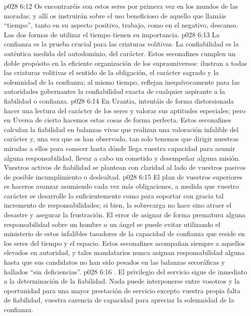 \vs p028 6:12 Os encontraréis con estos seres por primera vez en los mundos de las moradas; y allí os instruirán sobre el uso beneficioso de aquello que llamáis “tiempo”, tanto en su aspecto positivo, trabajo, como en el negativo, descanso. Las dos formas de utilizar el tiempo tienen su importancia.
\vs p028 6:13  La confianza es la prueba crucial para las criaturas volitivas. La confiabilidad es la auténtica medida del autodominio, del carácter. Estos seconafines cumplen un doble propósito en la eficiente organización de los suprauniversos: ilustran a todas las criaturas volitivas el sentido de la obligación, el carácter sagrado y la solemnidad de la confianza; al mismo tiempo, reflejan inequívocamente para las autoridades gobernantes la confiabilidad exacta de cualquier aspirante a la fiabilidad o confianza.
\vs p028 6:14 En Urantia, intentáis de forma distorsionada hacer una lectura del carácter de los seres y valorar sus aptitudes especiales; pero en Uversa de cierto hacemos estas cosas de forma perfecta. Estos seconafines calculan la fiabilidad en balanzas vivas que realizan una valoración infalible del carácter y, una vez que os han observado, tan solo tenemos que dirigir nuestras miradas a ellos para conocer hasta dónde llega vuestra capacidad para asumir alguna responsabilidad, llevar a cabo un cometido y desempeñar alguna misión. Vuestros activos de fiabilidad se plantean con claridad al lado de vuestros pasivos de posible incumplimiento o deslealtad.
\vs p028 6:15 \pc El plan de vuestros superiores es haceros avanzar asumiendo cada vez más obligaciones, a medida que vuestro carácter se desarrolle lo suficientemente como para soportar con gracia tal incremento de responsabilidades; si bien, la sobrecarga no hace sino atraer el desastre y asegurar la frustración. El error de asignar de forma prematura alguna responsabilidad sobre un hombre o un ángel se puede evitar utilizando el ministerio de estos infalibles tasadores de la capacidad de confianza que reside en los seres del tiempo y el espacio. Estos seconafines acompañan siempre a aquellos elevados en autoridad, y tales mandatarios nunca asignan responsabilidad alguna hasta que sus candidatos no han sido pesados en las balanzas secoráficas y hallados “sin deficiencias”.
\vs p028 6:16 . El privilegio del servicio sigue de inmediato a la determinación de la fiabilidad. Nada puede interponerse entre vosotros y la oportunidad para una mayor prestación de servicio excepto vuestra propia falta de fiabilidad, vuestra carencia de capacidad para apreciar la solemnidad de la confianza.
